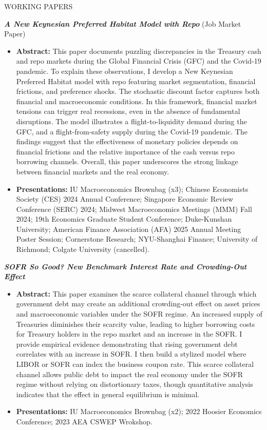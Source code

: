 \documentclass{resume} %
\begin{document}
\begin{rSection}{WORKING PAPERS}
    
    \textit{\textbf{A New Keynesian Preferred Habitat Model with Repo} } (Job Market Paper)
    \begin{itemize}
        \item[]\textbf{Abstract:} This paper documents puzzling discrepancies in the Treasury cash and repo markets during the Global Financial Crisis (GFC) and the Covid-19 pandemic. To explain these observations, I develop a New Keynesian Preferred Habitat model with repo featuring market segmentation, financial frictions, and preference shocks. The stochastic discount factor captures both financial and macroeconomic conditions. In this framework, financial market tensions can trigger real recessions, even in the absence of fundamental disruptions. The model illustrates a flight-to-liquidity demand during the GFC, and a flight-from-safety supply during the Covid-19 pandemic. The findings suggest that the effectiveness of monetary policies depends on financial frictions and the relative importance of the cash versus repo borrowing channels. Overall, this paper underscores the strong linkage between financial markets and the real economy.
        \item[]\textbf{Presentations:} IU Macroeconomics Brownbag (x3); Chinese Economists Society (CES) 2024 Annual Conference; Singapore Economic Review Conference (SERC) 2024; Midwest Macroeconomics Meetings (MMM) Fall 2024; 19th Economics Graduate Student Conference; Duke-Kunshan University; American Finance Association (AFA) 2025 Annual Meeting Poster Session; Cornerstone Research; NYU-Shanghai Finance; University of Richmond; Colgate University (cancelled).
    \end{itemize}
   
     

    \item \textit{\textbf{SOFR So Good? New Benchmark Interest Rate and Crowding-Out Effect} } 
    \begin{itemize}
        \item[]\textbf{Abstract:} This paper examines the scarce collateral channel through which government debt may create an additional crowding-out effect on asset prices and macroeconomic variables under the SOFR regime. An increased supply of Treasuries diminishes their scarcity value, leading to higher borrowing costs for Treasury holders in the repo market and an increase in the SOFR. I provide empirical evidence demonstrating that rising government debt correlates with an increase in SOFR.  I then build a stylized model where LIBOR or SOFR can index the business coupon rate. This scarce collateral channel allows public debt to impact the real economy under the SOFR regime without relying on distortionary taxes, though quantitative analysis indicates that the effect in general equilibrium is minimal.
        \item[]\textbf{Presentations:} IU Macroeconomics Brownbag (x2); 2022 Hoosier Economics Conference; 2023 AEA CSWEP Wrokshop.
    \end{itemize}
\end{rSection} 
\end{document}
